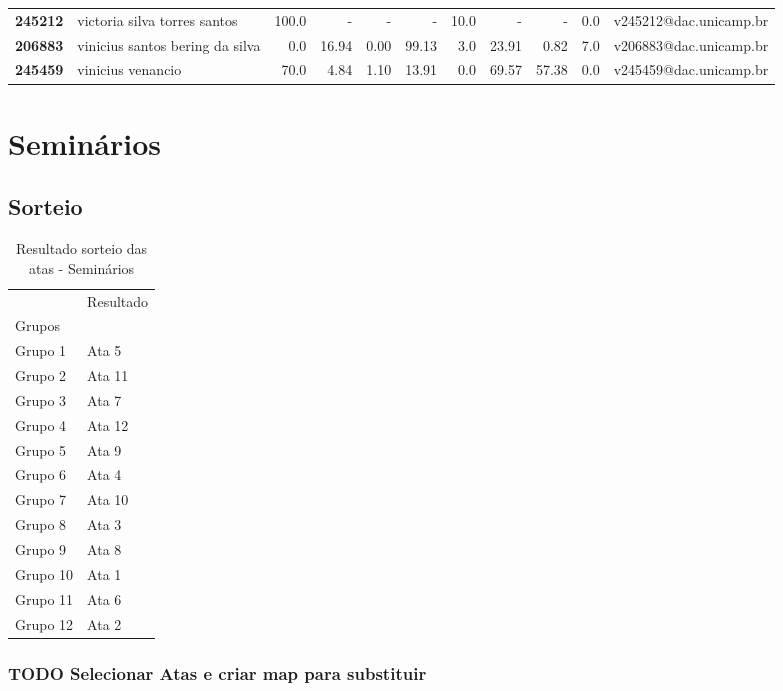 \documentclass[11pt]{article}
\begin{document}
\begin{center}
\begin{landscape}
\begin{longtable}{llrrrrrrrrl}
\textbf{245212} &          victoria silva torres santos &                 100.0 &           - &           - &           - &                     10.0 &           - &           - &                        0.0 &  v245212@dac.unicamp.br \\
\textbf{206883} &       vinicius santos bering da silva &                   0.0 &       16.94 &        0.00 &       99.13 &                      3.0 &       23.91 &        0.82 &                        7.0 &  v206883@dac.unicamp.br \\
\textbf{245459} &                     vinicius venancio &                  70.0 &        4.84 &        1.10 &       13.91 &                      0.0 &       69.57 &       57.38 &                        0.0 &  v245459@dac.unicamp.br \\
\end{longtable}
\end{landscape}\end{center}


\section{Seminários}
\label{sec:org91d6b7c}
\subsection{Sorteio}
\label{sec:org6edee68}

\begin{table}
\centering
\caption{Resultado sorteio das atas - Seminários}
\begin{tabular}{ll}
\toprule
{} & Resultado \\
Grupos   &           \\
\midrule
Grupo 1  &     Ata 5 \\
Grupo 2  &    Ata 11 \\
Grupo 3  &     Ata 7 \\
Grupo 4  &    Ata 12 \\
Grupo 5  &     Ata 9 \\
Grupo 6  &     Ata 4 \\
Grupo 7  &    Ata 10 \\
Grupo 8  &     Ata 3 \\
Grupo 9  &     Ata 8 \\
Grupo 10 &     Ata 1 \\
Grupo 11 &     Ata 6 \\
Grupo 12 &     Ata 2 \\
\bottomrule
\end{tabular}
\end{table}



\subsubsection{{\bfseries\sffamily TODO} Selecionar Atas e criar map para substituir}
\label{sec:org971901c}
\end{document}
